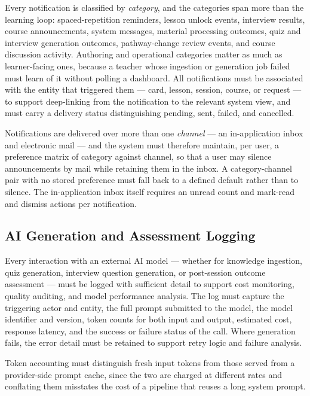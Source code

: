 Every notification is classified by \textit{category}, and the
categories span more than the learning loop: spaced-repetition
reminders, lesson unlock events, interview results, course
announcements, system messages, material processing outcomes, quiz and
interview generation outcomes, pathway-change review events, and
course discussion activity. Authoring and operational categories
matter as much as learner-facing ones, because a teacher whose
ingestion or generation job failed must learn of it without polling a
dashboard. All notifications must be associated with the entity that
triggered them — card, lesson, session, course, or request — to
support deep-linking from the notification to the relevant system
view, and must carry a delivery status distinguishing pending, sent,
failed, and cancelled.

Notifications are delivered over more than one \textit{channel} — an
in-application inbox and electronic mail — and the system must
therefore maintain, per user, a preference matrix of category against
channel, so that a user may silence announcements by mail while
retaining them in the inbox. A category-channel pair with no stored
preference must fall back to a defined default rather than to silence.
The in-application inbox itself requires an unread count and
mark-read and dismiss actions per notification.

\subsection{AI Generation and Assessment Logging}
Every interaction with an external AI model — whether for knowledge 
ingestion, quiz generation, interview question generation, or 
post-session outcome assessment — must be logged with sufficient 
detail to support cost monitoring, quality auditing, and model 
performance analysis. The log must capture the triggering actor and 
entity, the full prompt submitted to the model, the model identifier 
and version, token counts for both input and output, estimated cost, 
response latency, and the success or failure status of the call. 
Where generation fails, the error detail must be retained to support
retry logic and failure analysis.

Token accounting must distinguish fresh input tokens from those served
from a provider-side prompt cache, since the two are charged at
different rates and conflating them misstates the cost of a pipeline
that reuses a long system prompt.


